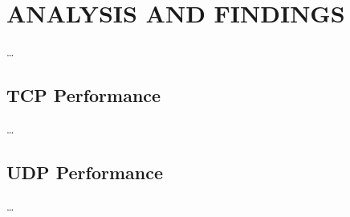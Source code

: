 
\section{ANALYSIS AND FINDINGS}


    \ldots

    \subsection{TCP Performance}

        \ldots

    \subsection{UDP Performance}

        \ldots
        